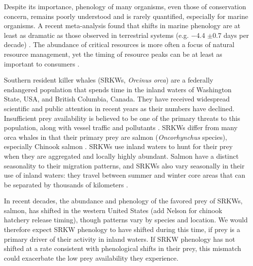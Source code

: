 \documentclass{article}
\begin{document}
\par Despite its importance, phenology of many organisms, even those of conservation concern, remains poorly understood and is rarely quantified, especially for marine organisms. A recent meta-analysis found that shifts in marine phenology are at least as dramatic as those observed in terrestrial systems (e.g. −4.4 $\pm$0.7 days per decade) \citep{poloczanska2013}. The abundance of critical resources is more often a focus of natural resource management, yet the timing of resource peaks can be at least as important to consumers \citep{hipfner2008}.
\par Southern resident killer whales (SRKWs, \emph{Orcinus orca}) are a federally endangered population that spends time in the inland waters of Washington State, USA, and British Columbia, Canada.  They have received widespread scientific and public attention in recent years as their numbers have declined\citep[e.g., Seattle Times articles,][]{lusseau2009,larson2018, olson2018}. Insufficient prey availability is believed to be one of the primary threats to this population, along with vessel traffic and pollutants \citep{krahn2007,lusseau2009,hanson2010}. SRKWs differ from many orca whales in that their primary prey are salmon (\emph{Oncorhynchus} species), especially Chinook salmon \citep[\emph{Oncorhynchus tshawytscha}][]{hanson2010}. SRKWs use inland waters to hunt for their prey when they are aggregated and locally highly abundant. Salmon have a distinct seasonality to their migration patterns,  and SRKWs also vary seasonally in their use of inland waters: they travel between summer and winter core areas that can be separated by thousands of kilometers \citep{balcomb1986,krahn2004}. 
\par In recent decades, the abundance and phenology of the favored prey of SRKWs, salmon, has shifted in the western United States \citep{weinheimer2017,reed2011,ford2006,satterthwaite2014}(add Nelson for chinook hatchery release timing), though patterns vary by species and location. We would therefore expect SRKW phenology to have shifted during this time, if prey is a primary driver of their activity in inland waters. If SRKW phenology has not shifted at a rate consistent with phenological shifts in their prey, this mismatch could exacerbate the low prey availability they experience. 
\end{document}
